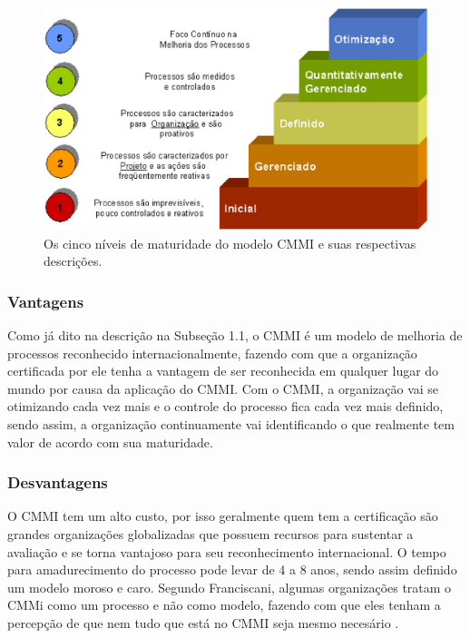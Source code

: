   \begin{figure}[!ht]
    \centering
    \includegraphics[width=15cm, keepaspectratio=true]{figuras/maturidade/niveis-cmmi.eps}
    \caption{Os cinco níveis de maturidade do modelo CMMI e suas respectivas descrições.}
  \end{figure}

    \subsubsection{Vantagens}

    Como já dito na descrição na Subseção 1.1, o CMMI é um modelo de melhoria
    de processos reconhecido internacionalmente, fazendo com que a organização
    certificada por ele tenha a vantagem de ser reconhecida em qualquer lugar
    do mundo por causa da aplicação do CMMI.
    Com o CMMI, a organização vai se otimizando cada vez mais e o controle do
    processo fica cada vez mais definido, sendo assim, a organização continuamente
    vai identificando o que realmente tem valor de acordo com sua maturidade.

    \subsubsection{Desvantagens}

    O CMMI tem um alto custo, por isso geralmente quem tem a certificação são
    grandes organizações globalizadas que possuem recursos para sustentar a
    avaliação e se torna vantajoso para seu reconhecimento internacional. O
    tempo para amadurecimento do processo pode levar de 4 a 8 anos, sendo assim
    definido um modelo moroso e caro. Segundo Franciscani, algumas organizações
    tratam o CMMi como um processo e não como modelo, fazendo com que eles tenham
    a percepção de que nem tudo que está no CMMI seja mesmo necesário
    \cite{francis2012}.


